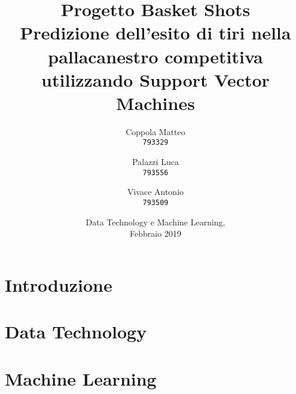 \documentclass[12pt,a4paper]{report}
\begin{document}
\title{%
  \Huge Progetto Basket Shots\\
  \large Predizione dell'esito di tiri nella pallacanestro competitiva utilizzando Support Vector Machines\\
    }
\author{
  Coppola Matteo\\
  \texttt{793329}
  \and
  Palazzi Luca\\
  \texttt{793556}
   \and
  Vivace Antonio\\
  \texttt{793509}
}
\date{Data Technology e Machine Learning, \\ Febbraio 2019}
\maketitle

\tableofcontents

\chapter{Introduzione}


\chapter{Data Technology}




\chapter{Machine Learning}





\end{document}
